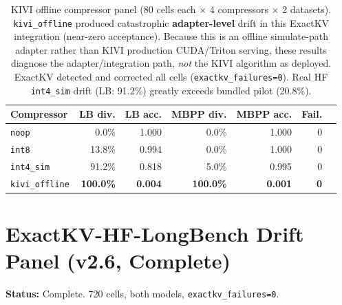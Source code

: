 \documentclass[11pt]{article}
\begin{document}
\begin{table}[htbp]
\centering\small
\renewcommand{\arraystretch}{1.05}
\begin{tabular}{lrrrrrr}
\toprule
\textbf{Compressor} & \textbf{LB div.} & \textbf{LB acc.} & \textbf{MBPP div.} & \textbf{MBPP acc.} & \textbf{Fail.} \\ \midrule
\texttt{noop} & 0.0\% & 1.000 & 0.0\% & 1.000 & 0 \\
\texttt{int8} & 13.8\% & 0.994 & 0.0\% & 1.000 & 0 \\
\texttt{int4\_sim} & 91.2\% & 0.818 & 5.0\% & 0.995 & 0 \\
\texttt{kivi\_offline} & \textbf{100.0\%} & \textbf{0.004} & \textbf{100.0\%} & \textbf{0.001} & \textbf{0} \\
\bottomrule
\end{tabular}
\caption{KIVI offline compressor panel (80 cells each × 4 compressors × 2 datasets).
\texttt{kivi\_offline} produced catastrophic \textbf{adapter-level} drift in this
ExactKV integration (near-zero acceptance). Because this is an offline simulate-path
adapter rather than KIVI production CUDA/Triton serving, these results diagnose the
adapter/integration path, \emph{not} the KIVI algorithm as deployed.
ExactKV detected and corrected all cells (\texttt{exactkv\_failures=0}).
Real HF \texttt{int4\_sim} drift (LB: 91.2\%) greatly exceeds bundled pilot (20.8\%).}
\label{tab:kivi-panel}
\end{table}

\section{ExactKV-HF-LongBench Drift Panel (v2.6, Complete)}

\textbf{Status:} Complete. 720 cells, both models, \texttt{exactkv\_failures=0}.
\end{document}
